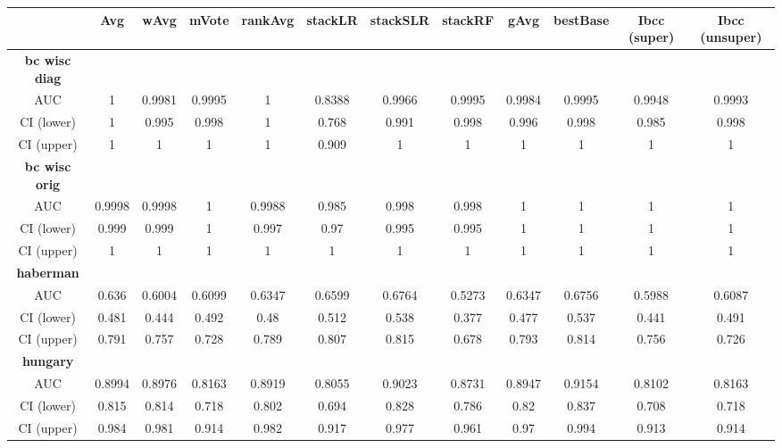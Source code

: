 \documentclass{bioinfo}
\begin{document}
\begin{table}[b]
\begin{tabular}
    {|c||c|c|c|c|c|c|c|c|c|c|c|}
    \hline
    & \textbf{Avg} & \textbf{wAvg} & \textbf{mVote} & \textbf{rankAvg} & \textbf{stackLR} & \textbf{stackSLR} & \textbf{stackRF} & \textbf{gAvg} & \textbf{bestBase} & \textbf{Ibcc (super)} & \textbf{Ibcc (unsuper)}\\ \hline

    \textbf{bc wisc diag} & & & & & & & & & & &\\
    AUC & 1 & 0.9981 & 0.9995 & 1 & 0.8388 & 0.9966 & 0.9995 & 0.9984 & 0.9995 & 0.9948 & 0.9993\\
    CI (lower) & 1 & 0.995 & 0.998 & 1 & 0.768 & 0.991 & 0.998 & 0.996 & 0.998 & 0.985 & 0.998\\
    CI (upper) & 1 & 1 & 1 & 1 & 0.909 & 1 & 1 & 1 & 1 & 1 & 1\\ \hline

    \textbf{bc wisc orig} & & & & & & & & & & &\\
    AUC & 0.9998 & 0.9998 & 1 & 0.9988 & 0.985 & 0.998 & 0.998 & 1 & 1 & 1 & 1\\
    CI (lower) & 0.999 & 0.999 & 1 & 0.997 & 0.97 & 0.995 & 0.995 & 1 & 1 & 1 & 1\\
    CI (upper) & 1 & 1 & 1 & 1 & 1 & 1 & 1 & 1 & 1 & 1 & 1\\ \hline

    \textbf{haberman} & & & & & & & & & & &\\
    AUC & 0.636 & 0.6004 & 0.6099 & 0.6347 & 0.6599 & 0.6764 & 0.5273 & 0.6347 & 0.6756 & 0.5988 & 0.6087\\
    CI (lower) & 0.481 & 0.444 & 0.492 & 0.48 & 0.512 & 0.538 & 0.377 & 0.477 & 0.537 & 0.441 & 0.491\\
    CI (upper) & 0.791 & 0.757 & 0.728 & 0.789 & 0.807 & 0.815 & 0.678 & 0.793 & 0.814 & 0.756 & 0.726\\ \hline

    \textbf{hungary} & & & & & & & & & & &\\
    AUC & 0.8994 & 0.8976 & 0.8163 & 0.8919 & 0.8055 & 0.9023 & 0.8731 & 0.8947 & 0.9154 & 0.8102 & 0.8163\\
    CI (lower) & 0.815 & 0.814 & 0.718 & 0.802 & 0.694 & 0.828 & 0.786 & 0.82 & 0.837 & 0.708 & 0.718\\
    CI (upper) & 0.984 & 0.981 & 0.914 & 0.982 & 0.917 & 0.977 & 0.961 & 0.97 & 0.994 & 0.913 & 0.914\\ \hline


\end{tabular}
\end{table}
\end{document}
